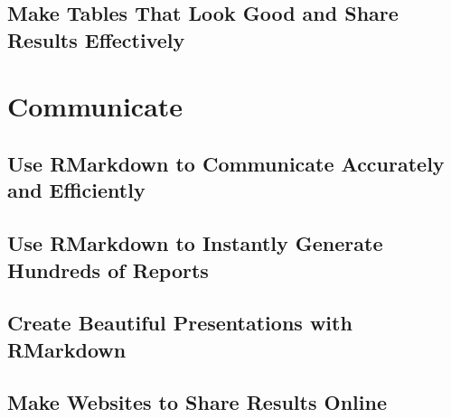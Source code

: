 \documentclass[
]{book}
\begin{document}
\hypertarget{make-tables-that-look-good-and-share-results-effectively}{%
\chapter*{Make Tables That Look Good and Share Results Effectively}\label{make-tables-that-look-good-and-share-results-effectively}}

\hypertarget{part-communicate}{%
\part*{Communicate}\label{part-communicate}}

\hypertarget{use-rmarkdown-to-communicate-accurately-and-efficiently}{%
\chapter*{Use RMarkdown to Communicate Accurately and Efficiently}\label{use-rmarkdown-to-communicate-accurately-and-efficiently}}

\hypertarget{use-rmarkdown-to-instantly-generate-hundreds-of-reports}{%
\chapter*{Use RMarkdown to Instantly Generate Hundreds of Reports}\label{use-rmarkdown-to-instantly-generate-hundreds-of-reports}}

\hypertarget{create-beautiful-presentations-with-rmarkdown}{%
\chapter*{Create Beautiful Presentations with RMarkdown}\label{create-beautiful-presentations-with-rmarkdown}}

\hypertarget{make-websites-to-share-results-online}{%
\chapter*{Make Websites to Share Results Online}\label{make-websites-to-share-results-online}}
\end{document}
